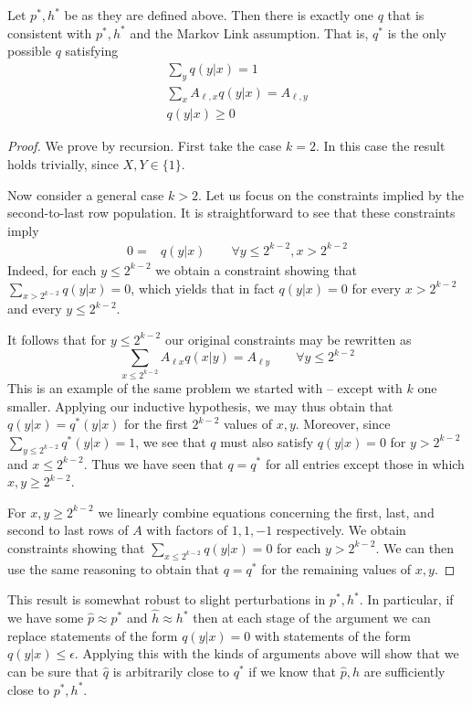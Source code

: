 \begin{thm}\label{thm:miracle}
Let $p^*,h^*$ be as they are defined above.  Then there is exactly one $q$ that is consistent with $p^*,h^*$ and the Markov Link assumption.  That is, $q^*$ is the only possible $q$ satisfying
\begin{gather*}
\sum_y q(y|x)=1 \\
\sum_x A_{\ell,x}q(y|x)=A_{\ell,y}\\
q(y|x)\geq 0
\end{gather*}
\end{thm} 
\begin{proof}
We prove by recursion.  First take the case $k=2$.  In this case the result holds trivially, since $X,Y\in\{1\}$.

Now consider a general case $k>2$.  Let us focus on the constraints implied by the second-to-last row population.  It is straightforward to see that these constraints imply
\begin{align*}
0=&q(y|x) \qquad \forall y\leq 2^{k-2},x>2^{k-2}
\end{align*}
Indeed, for each $y\leq 2^{k-2}$ we obtain a constraint showing that $\sum_{x>2^{k-2}}q(y|x)=0$, which yields that in fact $q(y|x)=0$ for every $x>2^{k-2}$ and every $y\leq 2^{k-2}$.

It follows that for $y\leq 2^{k-2}$ our original constraints may be rewritten as
\[
\sum_{x\leq2^{k-2}} A_{\ell x} q(x|y) = A_{\ell y} \qquad \forall y\leq 2^{k-2}
\]
This is an example of the same problem we started with -- except with $k$ one smaller.  Applying our inductive hypothesis, we may thus obtain that $q(y|x)=q^*(y|x)$ for the first $2^{k-2}$ values of $x,y$.  Moreover, since $\sum_{y\leq 2^{k-2}} q^*(y|x)=1$, we see that $q$ must also satisfy $q(y|x)=0$ for $y>2^{k-2}$ and $x\leq 2^{k-2}$.  Thus we have seen that $q=q^*$ for all entries except those in which $x,y\geq 2^{k-2}$.

For $x,y \geq2^{k-2}$ we linearly combine equations concerning the first, last, and second to last rows of $A$ with factors of $1,1,-1$ respectively.  We obtain constraints showing that $\sum_{x\leq2^{k-2}}q(y|x)=0$ for each $y>2^{k-2}$.  We can then use the same reasoning to obtain that $q=q^*$ for the remaining values of $x,y$.
\end{proof}

This result is somewhat robust to slight perturbations in $p^*,h^*$.  In particular, if we have some $\hat p\approx p^*$ and $\hat h\approx h^*$ then at each stage of the argument we can replace statements of the form $q(y|x)=0$ with statements of the form $q(y|x)\leq \epsilon$.  Applying this with the kinds of arguments above will show that we can be sure that $\hat q$ is arbitrarily close to $q^*$ if we know that $\hat p,\hat h$ are sufficiently close to $p^*,h^*$.  

